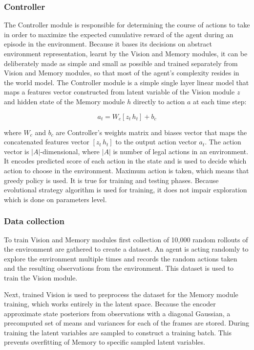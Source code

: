 \subsubsection{Controller}

The Controller module is responsible for determining the course of actions to take in order to maximize the expected cumulative reward of the agent during an episode in the environment. Because it bases its decisions on abstract environment representation, learnt by the Vision and Memory modules, it can be deliberately made as simple and small as possible and trained separately from Vision and Memory modules, so that most of the agent’s complexity resides in the world model. The Controller module is a simple single layer linear model that maps a features vector constructed from latent variable of the Vision module $z$ and hidden state of the Memory module $h$ directly to action $a$ at each time step:

$$a_t = W_c[z_t\,h_t] + b_c$$

where $W_c$ and $b_c$ are Controller's weights matrix and biases vector that maps the concatenated features vector $[z_t\,h_t]$ to the output action vector $a_t$. The action vector is $|A|$-dimensional, where $|A|$ is number of legal actions in an environment. It encodes predicted score of each action in the state and is used to decide which action to choose in the environment. Maximum action is taken, which means that greedy policy is used. It is true for training and testing phases. Because evolutional strategy algorithm is used for training, it does not impair exploration which is done on parameters level.

\subsubsection{Data collection}

To train Vision and Memory modules first collection of 10,000 random rollouts of the environment are gathered to create a dataset. An agent is acting randomly to explore the environment multiple times and records the random actions taken and the resulting observations from the environment. This dataset is used to train the Vision module.

Next, trained Vision is used to preprocess the dataset for the Memory module training, which works entirely in the latent space. Because the encoder approximate state posteriors from observations with a diagonal Gaussian, a precomputed set of means and variances for each of the frames are stored. During training the latent variables are sampled to construct a training batch. This prevents overfitting of Memory to specific sampled latent variables.

